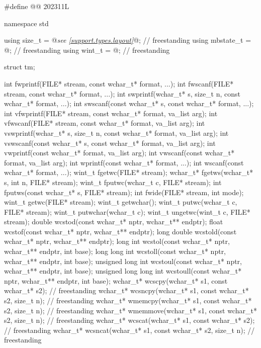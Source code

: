 \begin{codeblock}
#define @@ 202311L

namespace std {
  using size_t = @\textit{see \ref{support.types.layout}}@;                                             // freestanding
  using mbstate_t = @\seebelow@;                                          // freestanding
  using wint_t = @\seebelow@;                                             // freestanding

  struct tm;

  int fwprintf(FILE* stream, const wchar_t* format, ...);
  int fwscanf(FILE* stream, const wchar_t* format, ...);
  int swprintf(wchar_t* s, size_t n, const wchar_t* format, ...);
  int swscanf(const wchar_t* s, const wchar_t* format, ...);
  int vfwprintf(FILE* stream, const wchar_t* format, va_list arg);
  int vfwscanf(FILE* stream, const wchar_t* format, va_list arg);
  int vswprintf(wchar_t* s, size_t n, const wchar_t* format, va_list arg);
  int vswscanf(const wchar_t* s, const wchar_t* format, va_list arg);
  int vwprintf(const wchar_t* format, va_list arg);
  int vwscanf(const wchar_t* format, va_list arg);
  int wprintf(const wchar_t* format, ...);
  int wscanf(const wchar_t* format, ...);
  wint_t fgetwc(FILE* stream);
  wchar_t* fgetws(wchar_t* s, int n, FILE* stream);
  wint_t fputwc(wchar_t c, FILE* stream);
  int fputws(const wchar_t* s, FILE* stream);
  int fwide(FILE* stream, int mode);
  wint_t getwc(FILE* stream);
  wint_t getwchar();
  wint_t putwc(wchar_t c, FILE* stream);
  wint_t putwchar(wchar_t c);
  wint_t ungetwc(wint_t c, FILE* stream);
  double wcstod(const wchar_t* nptr, wchar_t** endptr);
  float wcstof(const wchar_t* nptr, wchar_t** endptr);
  long double wcstold(const wchar_t* nptr, wchar_t** endptr);
  long int wcstol(const wchar_t* nptr, wchar_t** endptr, int base);
  long long int wcstoll(const wchar_t* nptr, wchar_t** endptr, int base);
  unsigned long int wcstoul(const wchar_t* nptr, wchar_t** endptr, int base);
  unsigned long long int wcstoull(const wchar_t* nptr, wchar_t** endptr, int base);
  wchar_t* wcscpy(wchar_t* s1, const wchar_t* s2);                      // freestanding
  wchar_t* wcsncpy(wchar_t* s1, const wchar_t* s2, size_t n);           // freestanding
  wchar_t* wmemcpy(wchar_t* s1, const wchar_t* s2, size_t n);           // freestanding
  wchar_t* wmemmove(wchar_t* s1, const wchar_t* s2, size_t n);          // freestanding
  wchar_t* wcscat(wchar_t* s1, const wchar_t* s2);                      // freestanding
  wchar_t* wcsncat(wchar_t* s1, const wchar_t* s2, size_t n);           // freestanding
}
\end{codeblock}
